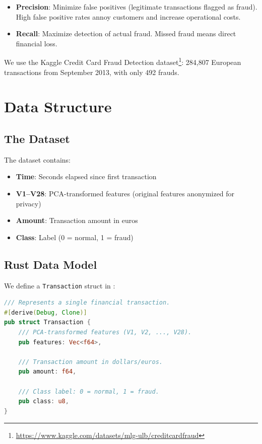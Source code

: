 \begin{itemize}
    \item \textbf{Precision}: Minimize false positives (legitimate transactions flagged as fraud). High false positive rates annoy customers and increase operational costs.
    \item \textbf{Recall}: Maximize detection of actual fraud. Missed fraud means direct financial loss.
\end{itemize}

We use the Kaggle Credit Card Fraud Detection dataset\footnote{\url{https://www.kaggle.com/datasets/mlg-ulb/creditcardfraud}}: 284,807 European transactions from September 2013, with only 492 frauds.

\section{Data Structure}

\subsection{The Dataset}

The dataset contains:
\begin{itemize}
    \item \textbf{Time}: Seconds elapsed since first transaction
    \item \textbf{V1--V28}: PCA-transformed features (original features anonymized for privacy)
    \item \textbf{Amount}: Transaction amount in euros
    \item \textbf{Class}: Label (0 = normal, 1 = fraud)
\end{itemize}


\subsection{Rust Data Model}

We define a \texttt{Transaction} struct in :

\begin{lstlisting}[language=Rust]
/// Represents a single financial transaction.
#[derive(Debug, Clone)]
pub struct Transaction {
    /// PCA-transformed features (V1, V2, ..., V28).
    pub features: Vec<f64>,

    /// Transaction amount in dollars/euros.
    pub amount: f64,

    /// Class label: 0 = normal, 1 = fraud.
    pub class: u8,
}
\end{lstlisting}


